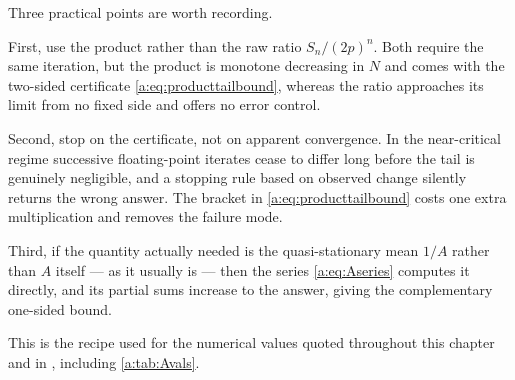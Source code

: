 Three practical points are worth recording.

First, use the product rather than the raw ratio $S_n/(2p)^n$. Both require the same
iteration, but the product is monotone decreasing in $N$ and comes with the two-sided
certificate \cref{a:eq:producttailbound}, whereas the ratio approaches its limit
from no fixed side and offers no error control.

Second, stop on the certificate, not on apparent convergence. In the near-critical
regime successive floating-point iterates cease to differ long before the tail is
genuinely negligible, and a stopping rule based on observed change silently returns
the wrong answer. The bracket in \cref{a:eq:producttailbound} costs one extra
multiplication and removes the failure mode.

Third, if the quantity actually needed is the quasi-stationary mean $1/A$ rather
than $A$ itself --- as it usually is --- then the series \cref{a:eq:Aseries}
computes it directly, and its partial sums increase to the answer, giving the
complementary one-sided bound.

This is the recipe used for the numerical values quoted throughout this chapter
and in \ChM, including \cref{a:tab:Avals}.
